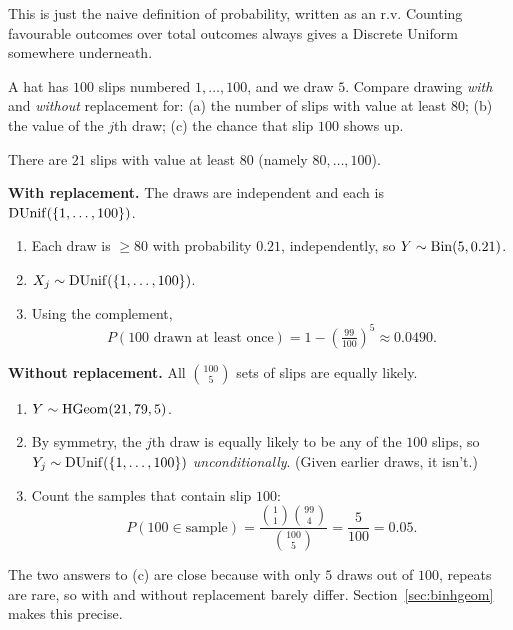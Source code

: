 \bigskip

\begin{intuition}
This is just the naive definition of probability, written as an r.v. Counting favourable outcomes over total outcomes always gives a Discrete Uniform somewhere underneath.
\end{intuition}

\bigskip

\begin{example}\label{ex:slips}
A hat has $100$ slips numbered $1, \dots, 100$, and we draw $5$. Compare drawing \emph{with} and \emph{without} replacement for: (a) the number of slips with value at least $80$; (b) the value of the $j$th draw; (c) the chance that slip $100$ shows up.
\end{example}

\medskip

\begin{solution}
There are $21$ slips with value at least $80$ (namely $80, \dots, 100$).

\medskip

\textbf{With replacement.} The draws are independent and each is $\operatorname{DUnif}(\{1, \dots, 100\})$.
\medskip
\begin{enumerate}[label=(\alph*)]
  \setlength{\itemsep}{0.4em}
  \item Each draw is $\ge 80$ with probability $0.21$, independently, so $Y \sim \operatorname{Bin}(5, 0.21)$.
  \item $X_j \sim \operatorname{DUnif}(\{1, \dots, 100\})$.
  \item Using the complement,
  \medskip
  \[
  P(\text{100 drawn at least once}) = 1 - \left(\tfrac{99}{100}\right)^{5} \approx 0.0490.
  \]
\end{enumerate}

\medskip

\textbf{Without replacement.} All $\binom{100}{5}$ sets of slips are equally likely.
\medskip
\begin{enumerate}[label=(\alph*)]
  \setlength{\itemsep}{0.4em}
  \item $Y \sim \operatorname{HGeom}(21, 79, 5)$.
  \item By symmetry, the $j$th draw is equally likely to be any of the $100$ slips, so $Y_j \sim \operatorname{DUnif}(\{1, \dots, 100\})$ \emph{unconditionally}. (Given earlier draws, it isn't.)
  \item Count the samples that contain slip $100$:
  \medskip
  \[
  P(100 \in \text{sample}) = \frac{\binom{1}{1}\binom{99}{4}}{\binom{100}{5}} = \frac{5}{100} = 0.05.
  \]
\end{enumerate}
\medskip
The two answers to (c) are close because with only $5$ draws out of $100$, repeats are rare, so with and without replacement barely differ. Section~\ref{sec:binhgeom} makes this precise.
\end{solution}

